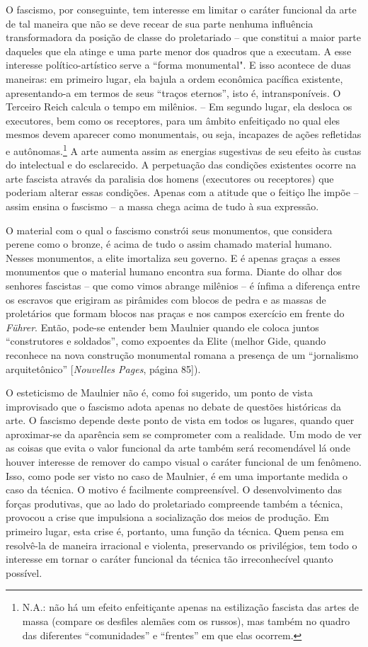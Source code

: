 O fascismo, por conseguinte, tem interesse ​​em limitar o caráter
funcional da arte de tal maneira que não se deve recear de sua parte
nenhuma influência transformadora da posição de classe do proletariado
-- que constitui a maior parte daqueles que ela atinge e uma parte menor
dos quadros que a executam. A esse interesse político-artístico serve a
``forma monumental". E isso acontece de duas maneiras: em primeiro
lugar, ela bajula a ordem econômica pacífica existente, apresentando-a
em termos de seus ``traços eternos'', isto é, intransponíveis. O
Terceiro Reich calcula o tempo em milênios. -- Em segundo lugar, ela
desloca os executores, bem como os receptores, para um âmbito
enfeitiçado no qual eles mesmos devem aparecer como monumentais, ou
seja, incapazes de ações refletidas e autônomas.\footnote{N.A.: não há
  um efeito enfeitiçante apenas na estilização fascista das artes de
  massa (compare os desfiles alemães com os russos), mas também no
  quadro das diferentes ``comunidades'' e ``frentes'' em que elas
  ocorrem.} A arte aumenta assim as energias sugestivas de seu efeito às
custas do intelectual e do esclarecido. A perpetuação das condições
existentes ocorre na arte fascista através da paralisia dos homens
(executores ou receptores) que poderiam alterar essas condições. Apenas
com a atitude que o feitiço lhe impõe -- assim ensina o fascismo -- a
massa chega acima de tudo à sua expressão.

O material com o qual o fascismo constrói seus monumentos, que considera
perene como o bronze, é acima de tudo o assim chamado material humano.
Nesses monumentos, a elite imortaliza seu governo. E é apenas graças a
esses monumentos que o material humano encontra sua forma. Diante do
olhar dos senhores fascistas -- que como vimos abrange milênios -- é
ínfima a diferença entre os escravos que erigiram as pirâmides com
blocos de pedra e as massas de proletários que formam blocos nas praças
e nos campos exercício em frente do \emph{Führer}. Então, pode-se
entender bem Maulnier quando ele coloca juntos ``construtores e
soldados'', como expoentes da Elite (melhor Gide, quando reconhece na
nova construção monumental romana a presença de um ``jornalismo
arquitetônico'' {[}\emph{Nouvelles Pages}, página 85{]}).

O esteticismo de Maulnier não é, como foi sugerido, um ponto de vista
improvisado que o fascismo adota apenas no debate de questões históricas
da arte. O fascismo depende deste ponto de vista em todos os lugares,
quando quer aproximar-se da aparência sem se comprometer com a
realidade. Um modo de ver as coisas que evita o valor funcional da arte
também será recomendável lá onde houver interesse de remover do campo
visual o caráter funcional de um fenômeno. Isso, como pode ser visto no
caso de Maulnier, é em uma importante medida o caso da técnica. O motivo
é facilmente compreensível. O desenvolvimento das forças produtivas, que
ao lado do proletariado compreende também a técnica, provocou a crise
que impulsiona a socialização dos meios de produção. Em primeiro lugar,
esta crise é, portanto, uma função da técnica. Quem pensa em resolvê-la
de maneira irracional e violenta, preservando os privilégios, tem todo o
interesse em tornar o caráter funcional da técnica tão irreconhecível
quanto possível.

